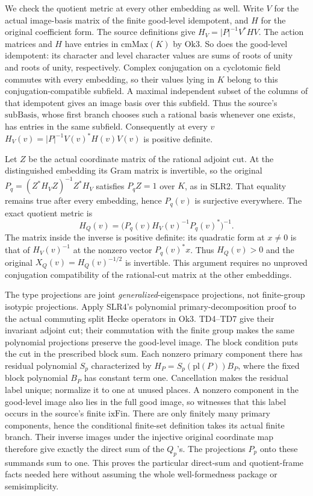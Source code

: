 We check the quotient metric at every other embedding as well.
Write \(V\) for the actual image-basis matrix of the finite
good-level idempotent, and \(H\) for the original coefficient
form.  The source definitions give
\(H_V=|P|^{-1}V^*HV\).  The action matrices and \(H\) have
entries in \(\mathrm{cmMax}(K)\) by \(\mathrm{Ok3}\).
So does the good-level idempotent: its character and level
character values are sums of roots of unity and roots of unity,
respectively.  Complex conjugation on a cyclotomic field
commutes with every embedding, so their values lying in \(K\)
belong to this conjugation-compatible subfield.  A maximal
independent subset of the columns of that idempotent gives
an image basis over this subfield.  Thus the source's
\(\mathrm{subBasis}\), whose first branch chooses such a
rational basis whenever one exists, has entries in the same
subfield.  Consequently at every \(v\)
\(H_V(v)=|P|^{-1}V(v)^*H(v)V(v)\) is positive definite.

Let \(Z\) be the actual coordinate matrix of the rational
adjoint cut.  At the distinguished embedding its Gram matrix
is invertible, so the original
\(P_q=(Z^*H_VZ)^{-1}Z^*H_V\) satisfies \(P_qZ=1\)
over \(K\), as in SLR2.  That equality remains true after
every embedding, hence \(P_q(v)\) is surjective everywhere.
The exact quotient metric is
\[
 H_Q(v)=\bigl(P_q(v)H_V(v)^{-1}P_q(v)^*\bigr)^{-1}.
\]
The matrix inside the inverse is positive definite: its
quadratic form at \(x\ne0\) is that of \(H_V(v)^{-1}\)
at the nonzero vector \(P_q(v)^*x\).  Thus \(H_Q(v)>0\)
and the original \(X_Q(v)=H_Q(v)^{-1/2}\) is invertible.
This argument requires no unproved conjugation compatibility
of the rational-cut matrix at the other embeddings.

The type projections are joint \emph{generalized}-eigenspace
projections, not finite-group isotypic projections.  Apply
SLR4's polynomial primary-decomposition proof to the actual
commuting split Hecke operators in \(\mathrm{Ok3}\).
TD4--TD7 give their invariant adjoint cut; their commutation
with the finite group makes the same polynomial projections
preserve the good-level image.  The \(\mathrm{block}\)
condition puts the cut in the prescribed block sum.  Each
nonzero primary component there has residual polynomial
\(S_p\) characterized by
\(H_P=S_p(\mathrm{pl}(P))B_P\), where the fixed block
polynomial \(B_P\) has constant term one.  Cancellation
makes the residual label unique; normalize it to one at
unused places.  A nonzero component in the good-level image
also lies in the full good image, so witnesses that this
label occurs in the source's finite \(\mathrm{ixFin}\).
There are only finitely many primary components, hence the
conditional finite-set definition takes its actual finite
branch.  Their inverse images under the injective original
coordinate map therefore give exactly the direct sum of
the \(Q_p\)'s.  The projections \(P_p\) onto these summands
sum to one.  This proves the particular direct-sum and
quotient-frame facts needed here without assuming the
whole well-formedness package or semisimplicity.

